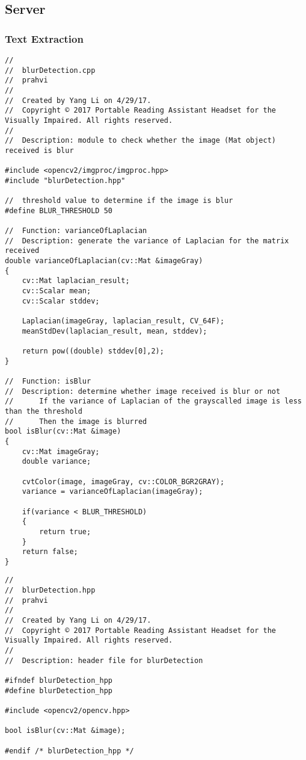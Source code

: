 \subsection{Server}

\subsubsection{Text Extraction}
\begin{lstlisting}
//
//  blurDetection.cpp
//  prahvi
//
//  Created by Yang Li on 4/29/17.
//  Copyright © 2017 Portable Reading Assistant Headset for the Visually Impaired. All rights reserved.
//
//	Description: module to check whether the image (Mat object) received is blur

#include <opencv2/imgproc/imgproc.hpp>
#include "blurDetection.hpp"

//	threshold value to determine if the image is blur
#define BLUR_THRESHOLD 50

//	Function: varianceOfLaplacian
//	Description: generate the variance of Laplacian for the matrix received
double varianceOfLaplacian(cv::Mat &imageGray)
{
	cv::Mat laplacian_result;
	cv::Scalar mean;
	cv::Scalar stddev;
	
	Laplacian(imageGray, laplacian_result, CV_64F);
	meanStdDev(laplacian_result, mean, stddev);
	
	return pow((double) stddev[0],2);
}

//	Function: isBlur
//	Description: determine whether image received is blur or not
//		If the variance of Laplacian of the grayscalled image is less than the threshold
//		Then the image is blurred
bool isBlur(cv::Mat &image)
{
	cv::Mat imageGray;
	double variance;
	
	cvtColor(image, imageGray, cv::COLOR_BGR2GRAY);
	variance = varianceOfLaplacian(imageGray);
	
	if(variance < BLUR_THRESHOLD)
	{
		return true;
	}
	return false;
}
\end{lstlisting}

\begin{lstlisting}
//
//  blurDetection.hpp
//  prahvi
//
//  Created by Yang Li on 4/29/17.
//  Copyright © 2017 Portable Reading Assistant Headset for the Visually Impaired. All rights reserved.
//
//	Description: header file for blurDetection

#ifndef blurDetection_hpp
#define blurDetection_hpp

#include <opencv2/opencv.hpp>

bool isBlur(cv::Mat &image);

#endif /* blurDetection_hpp */

\end{lstlisting}

